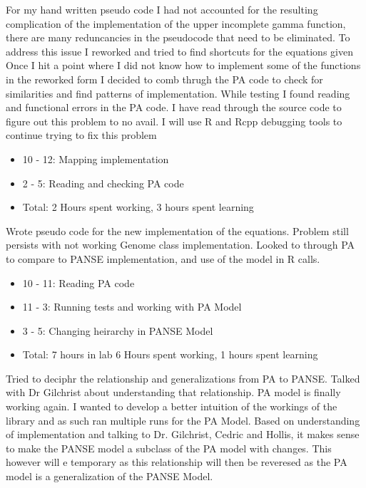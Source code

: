 \documentclass[12pt,hyperref]{labbook}
\begin{document}
For my hand written pseudo code I had not accounted for the resulting complication of the implementation of the upper incomplete gamma function, there are many reduncancies in the pseudocode that need to be eliminated. To address this issue I reworked and tried to find shortcuts for the equations given
Once I hit a point where I did not know how to implement some of the functions in the reworked form I decided to comb thrugh the PA code to check for similarities and find patterns of implementation. While testing I found reading and functional errors in the PA code. I have read through the source code to figure out this problem to no avail. I will use R and Rcpp debugging tools to continue trying to fix this problem
\begin{itemize}
    \item 10 - 12: Mapping implementation
    \item 2 - 5: Reading and checking PA code
    \item Total: 2 Hours spent working, 3 hours spent learning
\end{itemize}
Wrote pseudo code for the new implementation of the equations.
Problem still persists with not working Genome class implementation. Looked to through PA to compare to PANSE implementation, and use of the model in R calls.
\begin{itemize}
    \item 10 - 11: Reading PA code
    \item 11 - 3: Running tests and working with PA Model
    \item 3 - 5: Changing heirarchy in PANSE Model
    \item Total: 7 hours in lab 6 Hours spent working, 1 hours spent learning
\end{itemize}
Tried to deciphr the relationship and generalizations from PA to PANSE. Talked with Dr Gilchrist about understanding that relationship.
PA model is finally working again. I wanted to develop a better intuition of the workings of the library and as such ran multiple runs for the PA Model.
Based on understanding of implementation and talking to Dr. Gilchrist, Cedric and Hollis, it makes sense to make the PANSE model a subclass of the PA model with changes. This however will e temporary as this relationship will then be reveresed as the PA model is a generalization of the PANSE Model.
\end{document}
